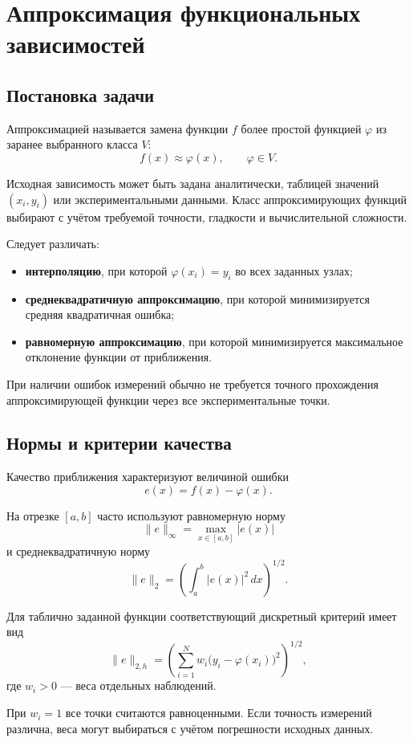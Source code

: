 \section{Аппроксимация функциональных зависимостей}
\label{sec:function-approximation}

\subsection{Постановка задачи}

Аппроксимацией называется замена функции $f$ более простой функцией $\varphi$ из заранее выбранного класса $V$:
\[
f(x)\approx \varphi(x), \qquad \varphi\in V.
\]

Исходная зависимость может быть задана аналитически, таблицей значений $(x_i,y_i)$ или экспериментальными данными. Класс аппроксимирующих функций
выбирают с учётом требуемой точности, гладкости и вычислительной сложности.

Следует различать:
\begin{itemize}
	\item \textbf{интерполяцию}, при которой $\varphi(x_i)=y_i$ во всех заданных узлах;
	\item \textbf{среднеквадратичную аппроксимацию}, при которой минимизируется средняя квадратичная ошибка;
	\item \textbf{равномерную аппроксимацию}, при которой минимизируется максимальное отклонение функции от приближения.
\end{itemize}

При наличии ошибок измерений обычно не требуется точного прохождения аппроксимирующей функции через все экспериментальные точки.

\subsection{Нормы и критерии качества}

Качество приближения характеризуют величиной ошибки
\[
e(x)=f(x)-\varphi(x).
\]

На отрезке $[a,b]$ часто используют равномерную норму
\[
\|e\|_{\infty}
=
\max_{x\in[a,b]}|e(x)|
\]
и среднеквадратичную норму
\[
\|e\|_2
=
\left(
\int_a^b |e(x)|^2\,dx
\right)^{1/2}.
\]

Для таблично заданной функции соответствующий дискретный критерий имеет вид
\[
\|e\|_{2,h}
=
\left(
\sum_{i=1}^{N}
w_i
\bigl(y_i-\varphi(x_i)\bigr)^2
\right)^{1/2},
\]
где $w_i>0$ --- веса отдельных наблюдений.

При $w_i=1$ все точки считаются равноценными. Если точность измерений различна, веса могут выбираться с учётом погрешности исходных данных.

